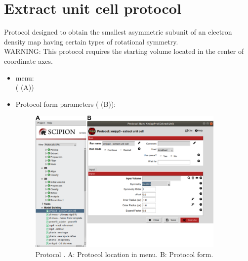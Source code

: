 \section{Extract unit cell protocol}
\label{app:extractUnitCell}%
Protocol designed to obtain the smallest asymmetric subunit of an electron density map having certain types of rotational symmetry.\\
WARNING: This protocol requires the starting volume located in the center of coordinate axes.\\

\begin{itemize}
  \item \scipion menu:\\
   ( (A))\\
  
  \item Protocol form parameters ( (B)):\\
  
  \begin{figure}[H]
    \centering 
    \captionsetup{width=.7\linewidth} 
    \includegraphics[width=0.90\textwidth]{Images_appendix/Fig107.pdf}
    \caption{Protocol . A: Protocol location in \scipion menu. B: Protocol form.}
    \label{fig:app_protocol_extractUnitCell_1}
   \end{figure}
  

\end{itemize}
